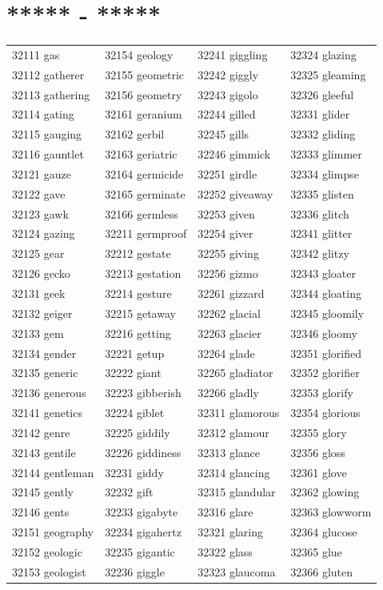 \documentclass[10pt, oneside]{book}
\begin{document}
\begin{table}[h]
	\centering
	\section*{***** - *****}
	\begin{tabular}{l l l l}
32111 gas &32154 geology &32241 giggling &32324 glazing\\
32112 gatherer &32155 geometric &32242 giggly &32325 gleaming\\
32113 gathering &32156 geometry &32243 gigolo &32326 gleeful\\
32114 gating &32161 geranium &32244 gilled &32331 glider\\
32115 gauging &32162 gerbil &32245 gills &32332 gliding\\
32116 gauntlet &32163 geriatric &32246 gimmick &32333 glimmer\\
32121 gauze &32164 germicide &32251 girdle &32334 glimpse\\
32122 gave &32165 germinate &32252 giveaway &32335 glisten\\
32123 gawk &32166 germless &32253 given &32336 glitch\\
32124 gazing &32211 germproof &32254 giver &32341 glitter\\
32125 gear &32212 gestate &32255 giving &32342 glitzy\\
32126 gecko &32213 gestation &32256 gizmo &32343 gloater\\
32131 geek &32214 gesture &32261 gizzard &32344 gloating\\
32132 geiger &32215 getaway &32262 glacial &32345 gloomily\\
32133 gem &32216 getting &32263 glacier &32346 gloomy\\
32134 gender &32221 getup &32264 glade &32351 glorified\\
32135 generic &32222 giant &32265 gladiator &32352 glorifier\\
32136 generous &32223 gibberish &32266 gladly &32353 glorify\\
32141 genetics &32224 giblet &32311 glamorous &32354 glorious\\
32142 genre &32225 giddily &32312 glamour &32355 glory\\
32143 gentile &32226 giddiness &32313 glance &32356 gloss\\
32144 gentleman &32231 giddy &32314 glancing &32361 glove\\
32145 gently &32232 gift &32315 glandular &32362 glowing\\
32146 gents &32233 gigabyte &32316 glare &32363 glowworm\\
32151 geography &32234 gigahertz &32321 glaring &32364 glucose\\
32152 geologic &32235 gigantic &32322 glass &32365 glue\\
32153 geologist &32236 giggle &32323 glaucoma &32366 gluten\\
	\end{tabular}
 \end{table}
\end{document}
